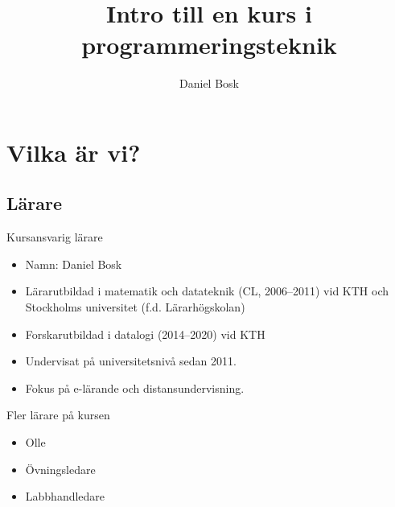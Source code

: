 \title{%
  Intro till en kurs i programmeringsteknik
}
\author{Daniel Bosk}


\mode*

\begin{abstract}
  
\end{abstract}


\section{Vilka är vi?}

\subsection{Lärare}

\begin{frame}
  \begin{block}{Kursansvarig lärare}
    \begin{itemize}
      \item Namn: Daniel Bosk
      \item Lärarutbildad i matematik och datateknik (CL, 2006--2011) vid KTH 
        och Stockholms universitet (f.d. Lärarhögskolan)
      \item Forskarutbildad i datalogi (2014--2020) vid KTH
      \item Undervisat på universitetsnivå sedan 2011.
      \item Fokus på e-lärande och distansundervisning.
    \end{itemize}
  \end{block}
\end{frame}

\begin{frame}
  \begin{block}{Fler lärare på kursen}
    \begin{itemize}
      \item Olle
      \item Övningsledare
      \item Labbhandledare
    \end{itemize}
  \end{block}
\end{frame}

